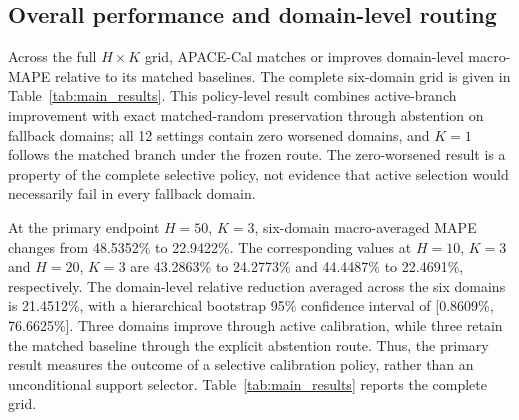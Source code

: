 \documentclass[preprint,12pt]{elsarticle}
\begin{document}
\subsection{Overall performance and domain-level routing}

Across the full $H\times K$ grid, APACE-Cal matches or improves domain-level macro-MAPE relative to its matched baselines. The complete six-domain grid is given in Table~\ref{tab:main_results}. This policy-level result combines active-branch improvement with exact matched-random preservation through abstention on fallback domains; all 12 settings contain zero worsened domains, and $K=1$ follows the matched branch under the frozen route. The zero-worsened result is a property of the complete selective policy, not evidence that active selection would necessarily fail in every fallback domain.

At the primary endpoint $H=50$, $K=3$, six-domain macro-averaged MAPE changes from 48.5352\% to 22.9422\%. The corresponding values at $H=10$, $K=3$ and $H=20$, $K=3$ are 43.2863\% to 24.2773\% and 44.4487\% to 22.4691\%, respectively. The domain-level relative reduction averaged across the six domains is 21.4512\%, with a hierarchical bootstrap 95\% confidence interval of [0.8609\%, 76.6625\%]. Three domains improve through active calibration, while three retain the matched baseline through the explicit abstention route. Thus, the primary result measures the outcome of a selective calibration policy, rather than an unconditional support selector. Table~\ref{tab:main_results} reports the complete grid.

\begin{table}[t]
\centering
\caption{Six-domain macro-averaged MAPE across the complete $H\times K$ grid. Each cell reports matched-random $\rightarrow$ APACE-Cal (\%).}
\label{tab:main_results}
\scriptsize
{}%
\end{table}
\end{document}
